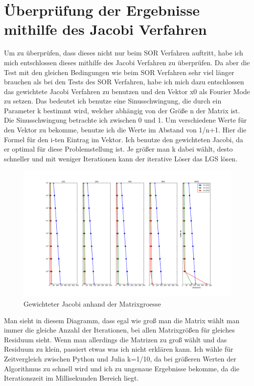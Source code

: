 \documentclass[a4paper, 11pt]{article}
\begin{document}
\newpage

\section{\"Uberpr\"ufung der Ergebnisse mithilfe des Jacobi Verfahren}
Um zu \"uberpr\"ufen, dass dieses nicht nur beim SOR Verfahren auftritt, habe ich mich entschlossen dieses mithilfe des Jacobi Verfahren zu \"uberpr\"ufen. Da aber die Test mit den gleichen Bedingungen wie beim SOR Verfahren 
sehr viel l\"anger brauchen als bei den Tests des SOR Verfahren, habe ich mich dazu entschlossen das gewichtete Jacobi Verfahren zu benutzen und den Vektor x0 als Fourier Mode zu setzen. 
Das bedeutet ich benutze eine Sinusschwingung, die durch ein Parameter k bestimmt wird, welcher abh\"angig von der Gr\"o\ss{}e n der Matrix ist. Die Sinusschwingung betrachte ich zwischen 0 und 1. 
Um verschiedene Werte f\"ur den Vektor zu bekomme, benutze ich die Werte im Abstand von 1/n+1. Hier die Formel f\"ur den i-ten Eintrag im Vektor. Ich benutze den gewichteten Jacobi, da er optimal f\"ur diese Problemstellung ist.
Je gr\"o\ss{}er man k dabei w\"ahlt, desto schneller und mit weniger Iterationen kann der iterative L\"oser das LGS l\"osen. 
\begin{figure}[h]
	\centering
	\includegraphics[width=1\textwidth]{Jacobi.png}
	\caption{Gewichteter Jacobi anhand der Matrixgroesse}
	\label{img:Bild3}
\end{figure}
Man sieht in diesem Diagramm, dass egal wie gro\ss{} man die Matrix w\"ahlt man immer die gleiche Anzahl der Iterationen, bei allen Matrixgr\"o\ss{}en f\"ur gleiches Residuum sieht. 
Wenn man allerdings die Matrizen zu gro\ss{} w\"ahlt und das Residuum zu klein, passiert etwas was ich nicht erkl\"aren kann.
Ich w\"ahle f\"ur Zeitvergleich zwischen Python und Julia k=1/10, da bei gr\"o\ss{}eren Werten der Algorithmus zu schnell wird und ich zu ungenaue Ergebnisse bekomme, da die Iterationszeit im Millisekunden Bereich liegt.
\end{document}
